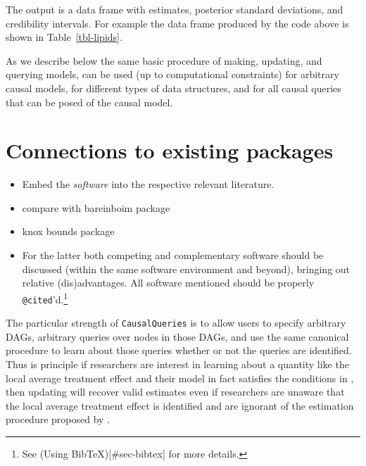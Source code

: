 \documentclass[
  11pt,
  article]{jss}
\begin{document}
The output is a data frame with estimates, posterior standard
deviations, and credibility intervals. For example the data frame
produced by the code above is shown in Table~\ref{tbl-lipids}.

As we describe below the same basic procedure of making, updating, and
querying models, can be used (up to computational constraints) for
arbitrary causal models, for different types of data structures, and for
all causal queries that can be posed of the causal model.

\hypertarget{connections-to-existing-packages}{%
\section{Connections to existing
packages}\label{connections-to-existing-packages}}

\begin{itemize}
\item
  Embed the \emph{software} into the respective relevant literature.
\item
  compare with bareinboim package
\item
  knox bounds package
\item
  For the latter both competing and complementary software should be
  discussed (within the same software environment and beyond), bringing
  out relative (dis)advantages. All software mentioned should be
  properly \texttt{@cited}'d.\footnote{See (Using
    BibTeX){[}\#sec-bibtex{]} for more details.}
\end{itemize}

The particular strength of \texttt{CausalQueries} is to allow users to
specify arbitrary DAGs, arbitrary queries over nodes in those DAGs, and
use the same canonical procedure to learn about those queries whether or
not the queries are identified. Thus is principle if researchers are
interest in learning about a quantity like the local average treatment
effect and their model in fact satisfies the conditions in
\citet{angrist1996identification}, then updating will recover valid
estimates even if researchers are unaware that the local average
treatment effect is identified and are ignorant of the estimation
procedure proposed by \citet{angrist1996identification}.
\end{document}
